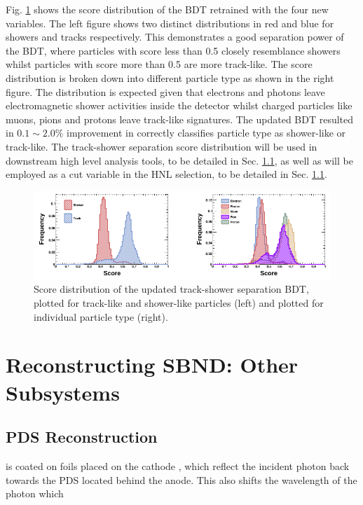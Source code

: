 Fig. \ref{fig:bdt_score} shows the score distribution of the BDT retrained with the four new variables.
The left figure shows two distinct distributions in red and blue for showers and tracks respectively.
This demonstrates a good separation power of the BDT, where particles with score less than 0.5 closely resemblance showers whilst particles with score more than 0.5 are more track-like.
The score distribution is broken down into different particle type as shown in the right figure.
The distribution is expected given that electrons and photons leave electromagnetic shower activities inside the detector whilst charged particles like muons, pions and protons leave track-like signatures. 
The updated BDT resulted in $0.1\sim2.0\%$ improvement in correctly classifies particle type as shower-like or track-like.
The track-shower separation score distribution will be used in downstream high level analysis tools, to be detailed in Sec. \ref{}, as well as will be employed as a cut variable in the HNL selection, to be detailed in Sec. \ref{}.

\begin{figure}[htbp!]
        \centering
        \includegraphics[width=\textwidth]{bdt_score}
        \caption[bdt_score]{
	Score distribution of the updated track-shower separation BDT, plotted for track-like and shower-like particles (left) and plotted for individual particle type (right).
	}
        \label{fig:bdt_score}
\end{figure}

\section{Reconstructing SBND: Other Subsystems}
\label{sec:reco_others}

\subsection{PDS Reconstruction}
is coated on foils placed on the cathode
, which reflect the incident photon back towards the PDS located behind the anode. 
This also shifts the wavelength of the photon which 

